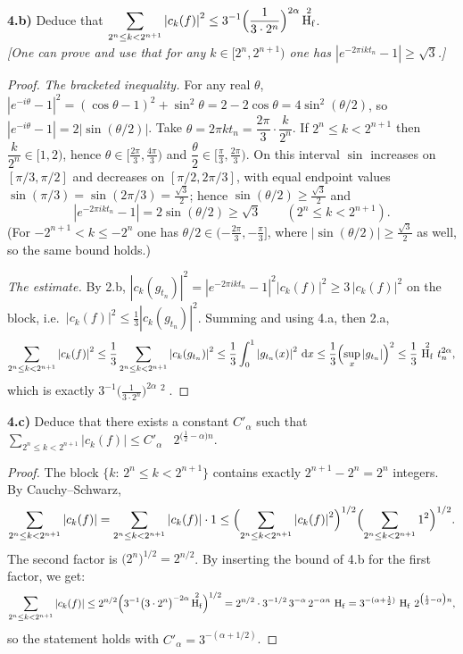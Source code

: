 \documentclass[11pt]{article}
\newcommand{\dd}{\,\mathrm{d}}
\newcommand{\abs}[1]{\left\lvert #1 \right\rvert}
\DeclareMathOperator{\Hf}{H_f}
\newcommand{\ck}[1]{c_{#1}}
\begin{document}
\bigskip
\noindent\textbf{4.b)} Deduce that
$\displaystyle\sum_{2^{n}\le k<2^{n+1}}\abs{\ck{k}(f)}^{2}\le 3^{-1}\Bigl(\frac1{3\cdot2^{n}}\Bigr)^{2\alpha}\Hf^{2}$.
\\[2pt]
\emph{[One can prove and use that for any $k\in[2^{n},2^{n+1})$ one has
$\abs{e^{-2\pi i k t_n}-1}\ge\sqrt3$.]}

\begin{proof}
\emph{The bracketed inequality.} For any real $\theta$,
$\abs{e^{-i\theta}-1}^2=(\cos\theta-1)^2+\sin^2\theta=2-2\cos\theta=4\sin^2(\theta/2)$, so
$\abs{e^{-i\theta}-1}=2\abs{\sin(\theta/2)}$. Take $\theta=2\pi k t_n=\dfrac{2\pi}{3}\cdot\dfrac{k}{2^{n}}$.
If $2^{n}\le k<2^{n+1}$ then $\dfrac{k}{2^{n}}\in[1,2)$, hence
$\theta\in\bigl[\tfrac{2\pi}{3},\tfrac{4\pi}{3}\bigr)$ and $\dfrac\theta2\in\bigl[\tfrac{\pi}{3},\tfrac{2\pi}{3}\bigr)$.
On this interval $\sin$ increases on $[\pi/3,\pi/2]$ and decreases on $[\pi/2,2\pi/3]$, with equal
endpoint values $\sin(\pi/3)=\sin(2\pi/3)=\tfrac{\sqrt3}{2}$; hence $\sin(\theta/2)\ge\tfrac{\sqrt3}{2}$ and
\[
\abs{e^{-2\pi i k t_n}-1}=2\sin(\theta/2)\ge\sqrt3
\qquad(2^{n}\le k<2^{n+1}).
\]
(For $-2^{n+1}<k\le -2^{n}$ one has $\theta/2\in(-\tfrac{2\pi}{3},-\tfrac\pi3]$, where
$\abs{\sin(\theta/2)}\ge\tfrac{\sqrt3}{2}$ as well, so the same bound holds.)

\smallskip
\emph{The estimate.} By 2.b, $\abs{\ck{k}(g_{t_n})}^2=\abs{e^{-2\pi i k t_n}-1}^2\abs{\ck{k}(f)}^2\ge 3\,\abs{\ck{k}(f)}^2$
on the block, i.e.\ $\abs{\ck{k}(f)}^2\le\tfrac13\abs{\ck{k}(g_{t_n})}^2$. Summing and using 4.a, then 2.a,
\[
\sum_{2^{n}\le k<2^{n+1}}\abs{\ck{k}(f)}^{2}
\le\frac13\sum_{2^{n}\le k<2^{n+1}}\abs{\ck{k}(g_{t_n})}^{2}
\le\frac13\int_0^1\abs{g_{t_n}(x)}^2\dd x
\le\frac13\Bigl(\sup_x\abs{g_{t_n}}\Bigr)^{2}
\le\frac13\,\Hf^{2}\,t_n^{2\alpha},
\]
which is exactly $3^{-1}\bigl(\tfrac1{3\cdot2^{n}}\bigr)^{2\alpha}\Hf^{2}$.
\end{proof}

\bigskip
\noindent\textbf{4.c)} Deduce that there exists a constant $C'_\alpha$ such that
$\displaystyle\sum_{2^{n}\le k<2^{n+1}}\abs{\ck{k}(f)}\le C'_\alpha\,\Hf\,2^{\bigl(\frac12-\alpha\bigr)n}$.

\begin{proof}
The block $\{k:\,2^{n}\le k<2^{n+1}\}$ contains exactly $2^{n+1}-2^n=2^{n}$ integers. By
Cauchy--Schwarz,
\[
\sum_{2^{n}\le k<2^{n+1}}\abs{\ck{k}(f)}
=\sum_{2^{n}\le k<2^{n+1}}\abs{\ck{k}(f)}\cdot 1
\le\Bigl(\sum_{2^{n}\le k<2^{n+1}}\abs{\ck{k}(f)}^{2}\Bigr)^{1/2}
\Bigl(\sum_{2^{n}\le k<2^{n+1}}1^{2}\Bigr)^{1/2}.
\]
The second factor is $\bigl(2^{n}\bigr)^{1/2}=2^{n/2}$. By inserting the bound of 4.b for the first factor, we get:
\[
\sum_{2^{n}\le k<2^{n+1}}\abs{\ck{k}(f)}
\le 2^{n/2}\Bigl(3^{-1}\bigl(3\cdot2^{n}\bigr)^{-2\alpha}\Hf^{2}\Bigr)^{1/2}
=2^{n/2}\cdot 3^{-1/2}\,3^{-\alpha}\,2^{-\alpha n}\,\Hf
=3^{-(\alpha+\frac12)}\,\Hf\,2^{\bigl(\frac12-\alpha\bigr)n},
\]
so the statement holds with $C'_\alpha=3^{-(\alpha+1/2)}$.
\end{proof}
\end{document}
